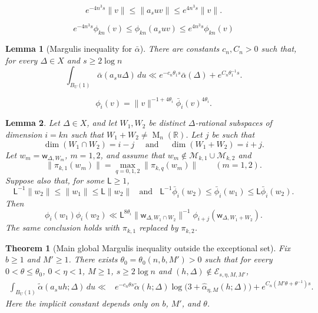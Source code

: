 \documentclass[10pt,a4paper]{amsart}
\newtheorem{lemma}{Lemma}
\newtheorem{theorem}{Theorem}
\newcommand{\M}{\op{M}}
\newcommand{\br}{\mathbb R}
\newcommand{\op}{\operatorname}
\begin{document}
\begin{equation}\label{eq:logLipschitzforwedge}
 e^{-4n^3 s}\|v\|
\le \|a_suv\|
\le e^{4n^3 s}\|v\|.
\end{equation}

\begin{equation}\label{eq:logLipschitzformodifiedht}
e^{-4n^3s}\phi_{kn}(v)
\le \phi_{kn}(a_suv)
\le e^{4n^3s}\phi_{kn}(v)
\end{equation}

\begin{lemma}[Margulis inequality for $\bar{\alpha}$]\label{prop:globalboundedexpansion'}
There are constants $c_n,C_n>0$ such that, for every $\Delta\in X$ and
$s\ge 2\log n$
\begin{equation}\label{eq:globalboundedexpansion'}
\int_{B_{U}(1)}
\bar\alpha(a_su\Delta)\,du
\ll
 e^{-c_n\theta_1 s}\bar\alpha(\Delta)
+
 e^{C_n\theta_1^{-1}s}.
\end{equation}
\end{lemma}

\begin{equation}\label{eq:phi-decomposition-global}
\phi_i(v)=\|v\|^{-1+4\theta_i}\bar\phi_i(v)^{4\theta_i}.
\end{equation}

\begin{lemma}\label{lem:BQinequality}
Let $\Delta\in X$, and let $W_1,W_2$ be distinct
$\Delta$-rational subspaces of dimension $i=kn$ such that $W_1+W_2\ne \M_n(\br)$. Let $j$ be such that 
$$
\dim(W_1\cap W_2)=i-j\quad 
\text{ and }\quad
\dim(W_1+W_2)=i+j.
$$
Let $w_m=\mathsf w_{\Delta,W_m}$, $m=1,2$, and assume that
$w_m\notin\mathcal M_{k,1}\cup\mathcal M_{k,2}$ and
$$
\|\pi_{k,1}(w_m)\|
=\max_{q=0,1,2}\|\pi_{k,q}(w_m)\|
\qquad (m=1,2).
$$
Suppose also that, for some $\mathsf L\ge1$,
$$
\mathsf L^{-1}\|w_2\|\le\|w_1\|\le\mathsf L\|w_2\|\;\; \text{ and }\;\; 
\mathsf L^{-1}\bar\phi_i(w_2)
\le\bar\phi_i(w_1)
\le\mathsf L\bar\phi_i(w_2).
$$
Then
\begin{equation}\label{eq:BQ-modified-height-inequality}
\phi_i(w_1)\phi_i(w_2)
\ll
\mathsf L^{8\theta_i}
\|\mathsf w_{\Delta,W_1\cap W_2}\|^{-1}
\phi_{i+j}(\mathsf w_{\Delta,W_1+W_2}).
\end{equation}
The same conclusion holds with $\pi_{k,1}$ replaced by $\pi_{k,2}$.
\end{lemma}

\begin{theorem}[Main global Margulis inequality outside the exceptional set]\label{thm:globalcontraction}
Fix $b\ge1$ and $M'\ge1$. There exists
$\theta_0=\theta_0(n,b,M')>0$ such that for every
$0<\theta\le\theta_0$, $0<\eta<1$, $M\ge1$,
$s\ge 2\log n$ and
$(h,\Delta)\notin\mathcal E_{s,\eta,M,M'}$,
\begin{equation}\label{eq:globalcontraction}
\begin{aligned}
\int_{B_U(1)}
\widetilde\alpha(a_suh;\Delta)\,du
\ll{}&
e^{-c_n\theta s}
\widetilde\alpha(h;\Delta)
\log\!\bigl(3+\widehat\alpha_{\eta,M}(h;\Delta)\bigr)
+e^{C_n(M'\theta+\theta^{-1})s}.
\end{aligned}
\end{equation} Here the implicit constant depends only on $b$, $M'$, and $\theta$.
\end{theorem}
\end{document}
